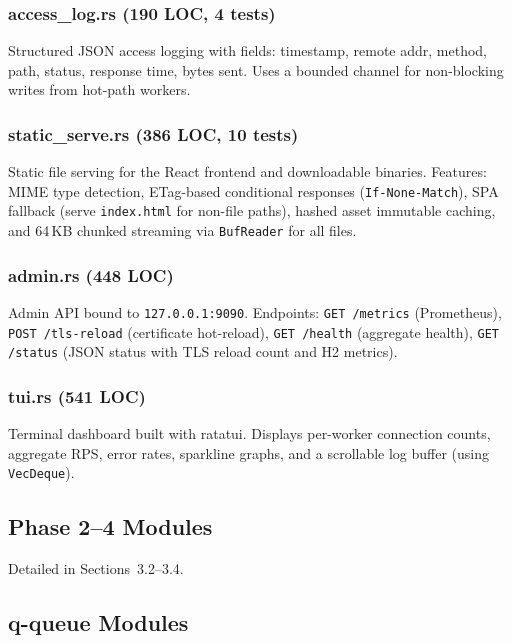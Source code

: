 \documentclass[a4paper, 11pt]{article}
\begin{document}
\subsubsection{access\_log.rs (190 LOC, 4 tests)}

Structured JSON access logging with fields: timestamp, remote addr,
method, path, status, response time, bytes sent.  Uses a bounded
channel for non-blocking writes from hot-path workers.

\subsubsection{static\_serve.rs (386 LOC, 10 tests)}

Static file serving for the React frontend and downloadable binaries.
Features: MIME type detection, ETag-based conditional responses
(\texttt{If-None-Match}), SPA fallback (serve \texttt{index.html} for
non-file paths), hashed asset immutable caching, and 64\,KB chunked
streaming via \texttt{BufReader} for all files.

\subsubsection{admin.rs (448 LOC)}

Admin API bound to \texttt{127.0.0.1:9090}.  Endpoints:
\texttt{GET /metrics} (Prometheus), \texttt{POST /tls-reload}
(certificate hot-reload), \texttt{GET /health} (aggregate health),
\texttt{GET /status} (JSON status with TLS reload count and H2 metrics).

\subsubsection{tui.rs (541 LOC)}

Terminal dashboard built with ratatui.  Displays per-worker
connection counts, aggregate RPS, error rates, sparkline graphs,
and a scrollable log buffer (using \texttt{VecDeque}).

\subsection{Phase 2--4 Modules}

Detailed in Sections~3.2--3.4.

\subsection{q-queue Modules}
\end{document}
